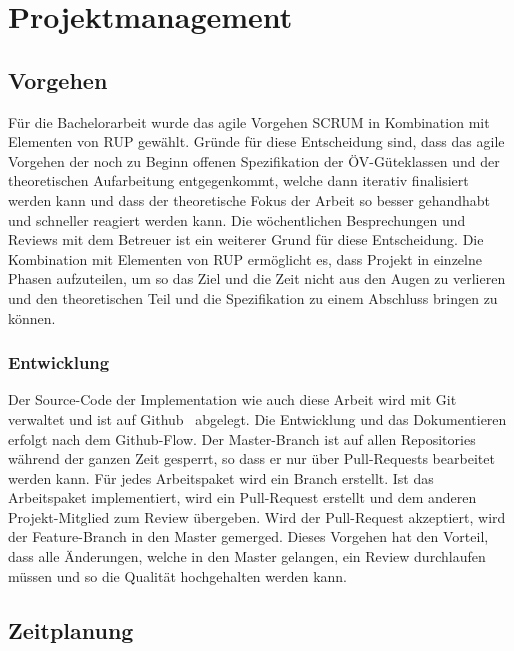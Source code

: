 
\section{Projektmanagement}
\label{Projektmanagement}

\subsection{Vorgehen}
\label{Projektmanagement:Vorgehen}

Für die Bachelorarbeit wurde das agile Vorgehen SCRUM in Kombination mit Elementen von \ac{RUP} gewählt.
Gründe für diese Entscheidung sind, dass das agile Vorgehen der noch zu Beginn offenen Spezifikation der \gls{ÖV-Güteklassen} und der theoretischen Aufarbeitung entgegenkommt, welche dann iterativ finalisiert werden kann und dass der theoretische Fokus der Arbeit so besser gehandhabt und schneller reagiert werden kann.
Die wöchentlichen Besprechungen und Reviews mit dem Betreuer ist ein weiterer Grund für diese Entscheidung.
Die Kombination mit Elementen von \ac{RUP} ermöglicht es, dass Projekt in einzelne Phasen aufzuteilen, um so das Ziel und die Zeit nicht aus den Augen zu verlieren und den theoretischen Teil und die Spezifikation zu einem Abschluss bringen zu können.

\subsubsection{Entwicklung}
\label{Vorgehen:Entwicklung}

Der Source-Code der Implementation wie auch diese Arbeit wird mit Git verwaltet und ist auf Github~\cite{github} abgelegt.
Die Entwicklung und das Dokumentieren erfolgt nach dem Github-Flow.
Der Master-Branch ist auf allen Repositories während der ganzen Zeit gesperrt, so dass er nur über Pull-Requests bearbeitet werden kann.
Für jedes Arbeitspaket wird ein Branch erstellt.
Ist das Arbeitspaket implementiert, wird ein Pull-Request erstellt und dem anderen Projekt-Mitglied zum Review übergeben.
Wird der Pull-Request akzeptiert, wird der Feature-Branch in den Master gemerged.
Dieses Vorgehen hat den Vorteil, dass alle Änderungen, welche in den Master gelangen, ein Review durchlaufen müssen und so die Qualität hochgehalten werden kann.


\subsection{Zeitplanung}
\label{Projektmanagement:Zeitplanung}

